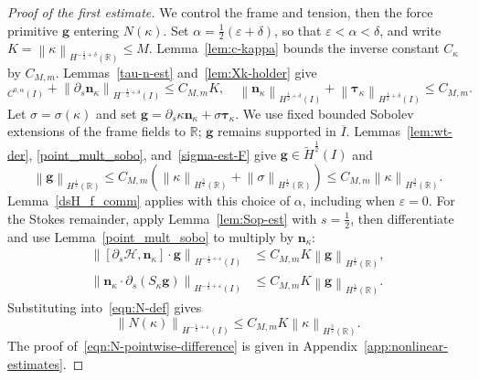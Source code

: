 \documentclass[11pt,reqno]{amsart}
\theoremstyle{plain}
\theoremstyle{definition}
\numberwithin{equation}{section}
\newcommand{\paren}[1]{\left(#1\right)}
\newcommand{\p}{\partial}
\newcommand{\mc}[1]{\mathcal{#1}}
\newcommand{\wt}[1]{\widetilde{#1}}
\newcommand{\bm}[1]{\boldsymbol{#1}}
\newcommand{\norm}[1]{\left\lVert #1 \right\rVert}
\newcommand{\R}{\mathbb{R}}
\newcommand{\tk}{\bm\tau_\kappa}
\newcommand{\nk}{\bm n_\kappa}
\newcommand{\ci}[1]{C^{#1}(I)}
\newcommand{\hi}[1]{H^{#1}(I)}
\newcommand{\thi}[1]{\wt H^{#1}(I)}
\newcommand{\hr}[1]{H^{#1}(\R)}
\begin{document}
\begin{proof}[Proof of the first estimate]
We control the frame and tension, then the force primitive $\bm g$
entering $N(\kappa)$.
Set $\alpha=\frac{1}{2}\paren{\varepsilon+\delta}$, so that
$\varepsilon<\alpha<\delta$, and write
$K=\norm{\kappa}_{\hr{-\frac{1}{2}+\delta}}\le M$.
Lemma~\ref{lem:c-kappa} bounds the inverse constant $C_\kappa$ by $C_{M,m}$.
Lemmas~\ref{tau-n-est} and~\ref{lem:Xk-holder} give
\begin{equation}
    [\nk]_{\ci{0,\alpha}}
    +\norm{\p_s\nk}_{\hi{-\frac{1}{2}+\delta}}
    \le C_{M,m}K,\quad
    \norm{\nk}_{\hi{\frac{1}{2}+\delta}}
    +\norm{\tk}_{\hi{\frac{1}{2}+\delta}}
    \le C_{M,m}.
\end{equation}
Let $\sigma=\sigma(\kappa)$ and set
$\bm g=\p_s\kappa\nk+\sigma\tk$. We use fixed bounded Sobolev
extensions of the frame fields to $\mathbb R$; $\bm g$ remains supported
in $\overline I$. Lemmas~\ref{lem:wt-der}, \ref{point_mult_sobo},
and~\ref{sigma-est-F} give $\bm g\in\thi{\frac12}$ and
\begin{equation}
    \norm{\bm g}_{\hr{\frac12}}
    \le C_{M,m}
    \paren{
        \norm{\kappa}_{\hr{\frac{3}{2}}}
        +\norm{\sigma}_{\hr{\frac{1}{2}}}
    }
    \le C_{M,m}\norm{\kappa}_{\hr{\frac32}}.
\end{equation}
Lemma~\ref{dsH_f_comm} applies with this choice of $\alpha$, including when
$\varepsilon=0$. For the Stokes remainder, apply Lemma~\ref{lem:Sop-est}
with $s=\frac12$, then differentiate and use Lemma~\ref{point_mult_sobo}
to multiply by $\nk$:
\begin{equation}
\begin{aligned}
    \norm{[\p_s\mc H,\nk]\cdot\bm g}_{\hi{-\frac12+\varepsilon}}
    &\le C_{M,m}K\norm{\bm g}_{\hr{\frac12}},\\
    \norm{\nk\cdot\p_s(S_\kappa\bm g)}_{\hi{-\frac12+\varepsilon}}
    &\le C_{M,m}K\norm{\bm g}_{\hr{\frac12}}.
\end{aligned}
\end{equation}
Substituting into~\eqref{eqn:N-def} gives
\begin{equation}
    \norm{N(\kappa)}_{\hi{-\frac12+\varepsilon}}
    \le C_{M,m}K\norm{\kappa}_{\hr{\frac32}}.
\end{equation}
The proof of~\eqref{eqn:N-pointwise-difference} is given in
Appendix~\ref{app:nonlinear-estimates}.
\end{proof}
\end{document}

